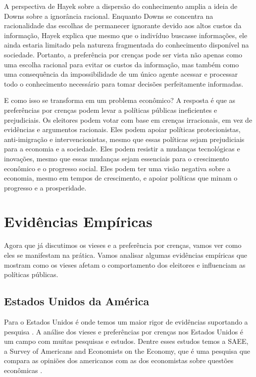A perspectiva de Hayek sobre a dispersão do conhecimento amplia a ideia de Downs sobre a ignorância racional. Enquanto Downs se concentra na racionalidade das escolhas de permanecer ignorante devido aos altos custos da informação, Hayek explica que mesmo que o indivíduo buscasse informações, ele ainda estaria limitado pela natureza fragmentada do conhecimento disponível na sociedade. Portanto, a preferência por crenças pode ser vista não apenas como uma escolha racional para evitar os custos da informação, mas também como uma consequência da impossibilidade de um único agente acessar e processar todo o conhecimento necessário para tomar decisões perfeitamente informadas.

E como isso se transforma em um problema econômico? A resposta é que as preferências por crenças podem levar a políticas públicas ineficientes e prejudiciais. Os eleitores podem votar com base em crenças irracionais, em vez de evidências e argumentos racionais. Eles podem apoiar políticas protecionistas, anti-imigração e intervencionistas, mesmo que essas políticas sejam prejudiciais para a economia e a sociedade. Eles podem resistir a mudanças tecnológicas e inovações, mesmo que essas mudanças sejam essenciais para o crescimento econômico e o progresso social. Eles podem ter uma visão negativa sobre a economia, mesmo em tempos de crescimento, e apoiar políticas que minam o progresso e a prosperidade.


\section{Evidências Empíricas}

Agora que já discutimos os vieses e a preferência por crenças, vamos ver como eles se manifestam na prática. Vamos analisar algumas evidências empíricas que mostram como os vieses afetam o comportamento dos eleitores e influenciam as políticas públicas.

\subsection{Estados Unidos da América}

Para o Estados Unidos é onde temos um maior rigor de evidências suportando a pesquisa \cite{The_Myth_of_the_Rational_Voter,Systematically_Biased_Beliefs_about_Economics,blendon-gap}. A análise dos vieses e preferências por crenças nos Estados Unidos é um campo com muitas pesquisas e estudos. Dentre esses estudos temos a SAEE, a Survey of Americans and Economists on the Economy, que é uma pesquisa que compara as opiniões dos americanos com as dos economistas sobre questões econômicas \cite{saee1996}.  

